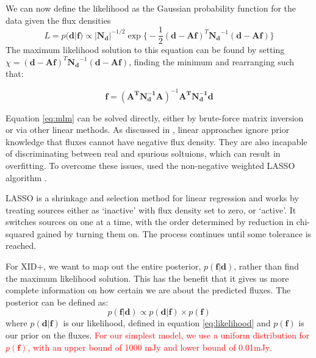 \documentclass[useAMS,usenatbib]{mnras}
\begin{document}
 We can now define the likelihood as the Gaussian probability function for the data given the flux densities
\begin{equation}
L = p(\mathbf{d}|\mathbf{f}) \propto |\mathbf{N_d}|^{-1/2} \exp\big\{ -\frac{1}{2}(\mathbf{d}-\mathbf{Af})^T\mathbf{N_d}^{-1}(\mathbf{d}-\mathbf{Af})\big\}\label{eq:likelihood}
\end{equation}
The maximum likelihood solution to this equation can be found by setting $\chi = (\mathbf{d}-\mathbf{Af})^T\mathbf{N_d}^{-1}(\mathbf{d}-\mathbf{Af})$, finding the minimum and rearranging such that:

\begin{equation}
\mathbf{f}=(\mathbf{A^TN_d^{-1}A})^{-1}\mathbf{A^TN_d^{-1}d}\label{eq:mlm}
\end{equation}

Equation \ref{eq:mlm} can be solved directly, either by brute-force matrix inversion or via other linear methods. As discussed in \cite{Roseboom:2010, Roseboom:2011, Wang:2014}, linear approaches ignore prior knowledge that fluxes cannot have negative flux density.  They are also incapable of discriminating between real and spurious soltuions, which can result in overfitting. To overcome these issues, \cite{Roseboom:2011} used the non-negative weighted LASSO algorithm \citep{Tibshirani:1996, Zou:2006, terBraak:2010}.

LASSO is a shrinkage and selection method for linear regression and works by treating sources either as `inactive' with flux density set to zero, or `active'. It switches sources on one at a time, with the order determined by reduction in chi-squared gained by turning them on. The process continues until some tolerance is reached.

%

For \textsc{XID+}, we want to map out the entire posterior, $p(\mathbf{f}|\mathbf{d})$, rather than find the maximum likelihood solution. This has the benefit that it gives us more complete information on how certain we are about the predicted fluxes. The posterior can be defined as:
\begin{equation}
p(\mathbf{f}|\mathbf{d}) \propto p(\mathbf{d}|\mathbf{f}) \times p(\mathbf{f})
\end{equation}
where $p(\mathbf{d}|\mathbf{f})$ is our likelihood, defined in equation \ref{eq:likelihood} and $p(\mathbf{f})$ is our prior on the fluxes. \textcolor{red}{For our simplest model, we use a uniform distribution for $p(\mathbf{f})$, with an upper bound of 1000 mJy and lower bound of 0.01mJy.} 
\end{document}
